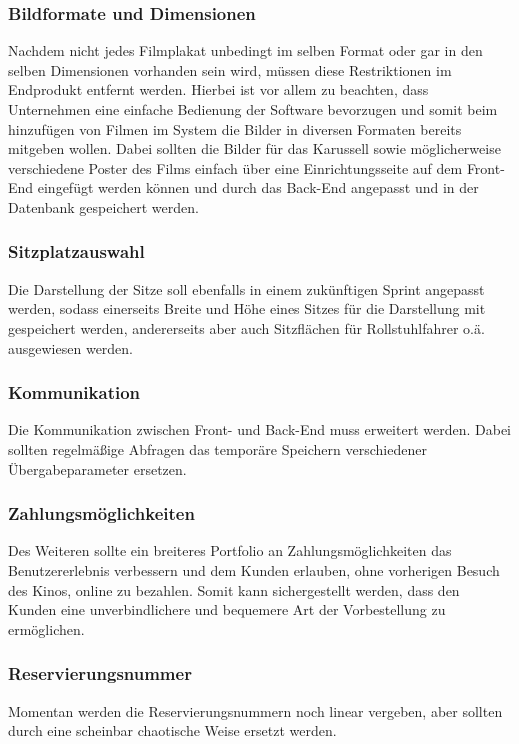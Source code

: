 \subsubsection*{Bildformate und Dimensionen}
\label{ssssec:bildformatedimensionen}
Nachdem nicht jedes Filmplakat unbedingt im selben Format oder gar in den selben Dimensionen vorhanden sein wird, müssen diese Restriktionen im Endprodukt entfernt werden.
Hierbei ist vor allem zu beachten, dass Unternehmen eine einfache Bedienung der Software bevorzugen und somit beim hinzufügen von Filmen im System die Bilder in diversen Formaten bereits mitgeben wollen.
Dabei sollten die Bilder für das Karussell sowie möglicherweise verschiedene Poster des Films einfach über eine Einrichtungsseite auf dem Front-End eingefügt werden können und durch das Back-End angepasst und in der Datenbank gespeichert werden.

\subsubsection*{Sitzplatzauswahl}
\label{ssssec:sitzplatzauswahl}
Die Darstellung der Sitze soll ebenfalls in einem zukünftigen Sprint angepasst werden, sodass einerseits Breite und Höhe eines Sitzes für die Darstellung mit gespeichert werden, andererseits aber auch Sitzflächen für Rollstuhlfahrer o.ä. ausgewiesen werden.

\subsubsection*{Kommunikation}
\label{ssssec:kommunikation}
Die Kommunikation zwischen Front- und Back-End muss erweitert werden.
Dabei sollten regelmäßige Abfragen das temporäre Speichern verschiedener Übergabeparameter ersetzen.

\subsubsection*{Zahlungsmöglichkeiten}
\label{ssssec:zahlungsmöglichkeiten}
Des Weiteren sollte ein breiteres Portfolio an Zahlungsmöglichkeiten das Benutzererlebnis verbessern und dem Kunden erlauben, ohne vorherigen Besuch des Kinos, online zu bezahlen.
Somit kann sichergestellt werden, dass den Kunden eine unverbindlichere und bequemere Art der Vorbestellung zu ermöglichen.

\subsubsection*{Reservierungsnummer}
\label{ssssec:reservierungsnummer}
Momentan werden die Reservierungsnummern noch linear vergeben, aber sollten durch eine scheinbar chaotische Weise ersetzt werden.

